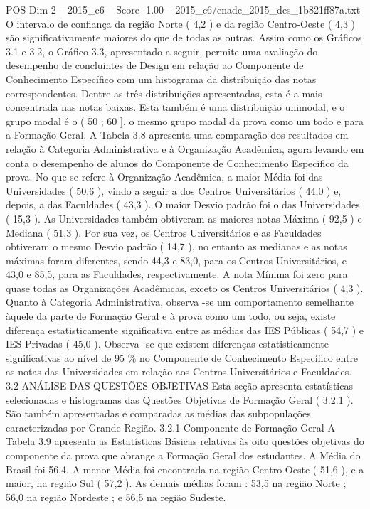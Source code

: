 \begin{textsample}{POS Dim 2 – 2015\_c6 – Score -1.00 – 2015\_c6/enade\_2015\_des\_1b821ff87a.txt}
O intervalo de confiança da região Norte ( 4,2 ) e da região Centro-Oeste ( 4,3 ) são significativamente maiores do que de todas as outras.
Assim como os Gráficos 3.1 e 3.2, o Gráfico 3.3, apresentado a seguir, permite uma avaliação do desempenho de concluintes de Design em relação ao Componente de Conhecimento Específico com um histograma da distribuição das notas correspondentes.
Dentre as três distribuições apresentadas, esta é a mais concentrada nas notas baixas.
Esta também é uma distribuição unimodal, e o grupo modal é o ( 50 ; 60 ], o mesmo grupo modal da prova como um todo e para a Formação Geral.
A Tabela 3.8 apresenta uma comparação dos resultados em relação à Categoria Administrativa e à Organização Acadêmica, agora levando em conta o desempenho de alunos do Componente de Conhecimento Específico da prova.
No que se refere à Organização Acadêmica, a maior Média foi das Universidades ( 50,6 ), vindo a seguir a dos Centros Universitários ( 44,0 ) e, depois, a das Faculdades ( 43,3 ).
O maior Desvio padrão foi o das Universidades ( 15,3 ).
As Universidades também obtiveram as maiores notas Máxima ( 92,5 ) e Mediana ( 51,3 ).
Por sua vez, os Centros Universitários e as Faculdades obtiveram o mesmo Desvio padrão ( 14,7 ), no entanto as medianas e as notas máximas foram diferentes, sendo 44,3 e 83,0, para os Centros Universitários, e 43,0 e 85,5, para as Faculdades, respectivamente.
A nota Mínima foi zero para quase todas as Organizações Acadêmicas, exceto os Centros Universitários ( 4,3 ).
Quanto à Categoria Administrativa, observa -se um comportamento semelhante àquele da parte de Formação Geral e à prova como um todo, ou seja, existe diferença estatisticamente significativa entre as médias das IES Públicas ( 54,7 ) e IES Privadas ( 45,0 ).
Observa -se que existem diferenças estatisticamente significativas ao nível de 95 \% no Componente de Conhecimento Específico entre as notas das Universidades em relação aos Centros Universitários e Faculdades. 3.2 ANÁLISE DAS QUESTÕES OBJETIVAS Esta seção apresenta estatísticas selecionadas e histogramas das Questões Objetivas de Formação Geral ( 3.2.1 ).
São também apresentadas e comparadas as médias das subpopulações caracterizadas por Grande Região. 3.2.1 Componente de Formação Geral A Tabela 3.9 apresenta as Estatísticas Básicas relativas às oito questões objetivas do componente da prova que abrange a Formação Geral dos estudantes.
A Média do Brasil foi 56,4.
A menor Média foi encontrada na região Centro-Oeste ( 51,6 ), e a maior, na região Sul ( 57,2 ).
As demais médias foram : 53,5 na região Norte ; 56,0 na região Nordeste ; e 56,5 na região Sudeste.

\end{textsample}
